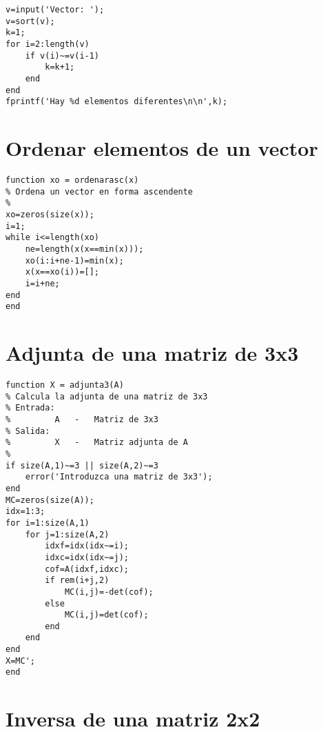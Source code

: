 
\sol

\begin{verbatim}
v=input('Vector: ');
v=sort(v);
k=1;
for i=2:length(v)
    if v(i)~=v(i-1)
        k=k+1;
    end
end
fprintf('Hay %d elementos diferentes\n\n',k);
\end{verbatim}

\section{Ordenar elementos de un vector}


\sol

\begin{verbatim}
function xo = ordenarasc(x)
% Ordena un vector en forma ascendente
%
xo=zeros(size(x));
i=1;
while i<=length(xo)
    ne=length(x(x==min(x)));
    xo(i:i+ne-1)=min(x);
    x(x==xo(i))=[];
    i=i+ne;
end
end
\end{verbatim}

\section{Adjunta de una matriz de 3x3}


\sol

\begin{verbatim}
function X = adjunta3(A)
% Calcula la adjunta de una matriz de 3x3
% Entrada:
%         A   -   Matriz de 3x3
% Salida:
%         X   -   Matriz adjunta de A
%
if size(A,1)~=3 || size(A,2)~=3
    error('Introduzca una matriz de 3x3');
end
MC=zeros(size(A));
idx=1:3;
for i=1:size(A,1)
    for j=1:size(A,2)
        idxf=idx(idx~=i);
        idxc=idx(idx~=j);
        cof=A(idxf,idxc);
        if rem(i+j,2)
            MC(i,j)=-det(cof);
        else
            MC(i,j)=det(cof);
        end
    end
end
X=MC';
end
\end{verbatim}


\section{Inversa de una matriz 2x2}

